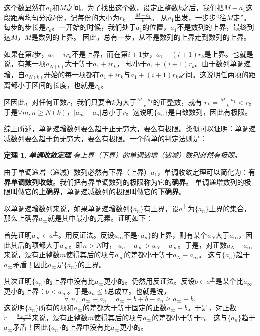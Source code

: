 \documentclass[12pt,UTF8]{ctexbook}
\newtheorem{tm}{定理}[section]
\begin{document}
这个数显然在$a_1$和$M$之间。为了找出这个数，设定正整数$k$之后，我们把$M - a_1$这段距离均匀分成$k$份，记每份的大小为$r_k = \frac{M - a_1}{k}$。
从$a_1$出发，一步步“往$M$走”。每步的步长是$r_k$。一开始的时候，我们处于$a_1$的位置，$a_1$不是数列的上界，最终到达$M$，$M$是数列的上界。
因此，总有一步，从不是数列的上界走到数列的上界。

如果在第$i$步，$a_1 + i r_k$不是上界，而在第$i+1$步，$a_1 + (i+1) r_k$是上界。也就是说，有某一项$a_{N(k)}$大于等于$a_1 + i r_k$，
却小于$a_1 + (i+1) r_k$。由于数列单调递增，自$a_{N(k)}$开始的每一项都在$a_1 + i r_k$与$a_1 + (i+1) r_k$之间。这说明任两项的距离都小于区间的长度，也就是$r_k$。

区因此，对任何正数$r$，我们只要令$k$为大于$\frac{M - a_1}{r}$的正整数，就有
$r_k = \frac{M - a_1}{k} < r$。于是$\forall m,n\geqslant N(k)$，$|a_m - a_n|$总小于$r$。这说明$\{a_n\}$是自敛数列，因此有极限。

综上所述，单调递增数列要么趋于正无穷大，要么有极限。类似可以证明：单调递减数列要么趋于负无穷大，要么有极限。一个简单的判定法则是：
\begin{tm}\textbf{单调收敛定理}
    有上界（下界）的单调递增（递减）数列必然有极限。
\end{tm}
由于单调递增（递减）数列必然有下界（上界）$a_1$，单调收敛定理可以简化为：\textbf{有界单调数列收敛}。我们把有界单调数列的极限称为它的\textbf{确界}。
单调递增数列的极限叫做它的\textbf{上确界}，单调递减数列的极限叫做它的\textbf{下确界}。

以单调递增数列来说，如果单调递增数列$\{a_n\}$有上界，设$a^{\text{上}}$为$\{a_n\}$上界的集合，那么上确界$a_\infty$就是其中最小的元素。证明如下：

首先证明$a_\infty \in a^{\text{上}}$。用反证法。反设$a_\infty$不是$\{a_n\}$的上界，则有某个$a_N$大于$a_\infty$，因此其后的项都大于$a_\infty$。即$n > N$时，
$a_n - a_\infty > a_N - a_\infty$。于是，对正数$a_N - a_\infty$来说，没有正整数$m$使得其后的项与$a_\infty$的差都小于等于$a_N - a_\infty$。
这与$\{a_n\}$趋于$a_\infty$矛盾！因此$a_\infty$是$\{a_n\}$的上界。

其次证明$\{a_n\}$的上界中没有比$a_\infty$更小的。仍然用反证法。反设$b \in a^{\text{上}}$是某个比$a_\infty$更小的上界：$b < a_\infty$。于是$a_n \leqslant b$总成立。也就是说，
$$\forall \,\, n, \,\,\, a_\infty - a_n = a_\infty - b + b - a_n \geqslant a_\infty - b.$$
这说明$\{a_n\}$所有的项和$a_\infty$的差都大于等于固定的正数$a_\infty - b$。于是，对正数$r = \frac{a_\infty - b}{2}$来说，没有正整数$m$使得其后的项与$a_\infty$的差都小于等于$r$。
这与$\{a_n\}$趋于$a_\infty$矛盾！因此$\{a_n\}$的上界中没有比$a_\infty$更小的。
\end{document}
